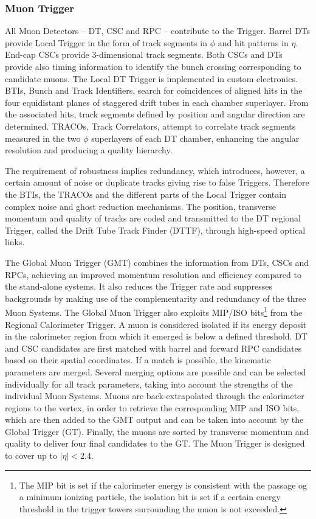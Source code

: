 \subsubsection{Muon Trigger}
All Muon Detectors -- DT, CSC and RPC -- contribute to the Trigger. Barrel
DTs provide Local Trigger in the form of track segments in $\phi$ and hit patterns in
$\eta$. End-cap CSCs provide 3-dimensional track segments. Both CSCs and DTs
provide also timing information to identify the bunch crossing corresponding to
candidate muons. The Local DT Trigger is implemented in custom electronics.
BTIs, Bunch and Track Identifiers, search for coincidences of aligned hits in the
four equidistant planes of staggered drift tubes in each chamber superlayer. From
the associated hits, track segments defined by position and angular direction are
determined. TRACOs, Track Correlators, attempt to correlate track segments
measured in the two $\phi$ superlayers of each DT chamber, enhancing the angular resolution and producing a
quality hierarchy.

The requirement of robustness implies redundancy, which introduces, however,
a certain amount of noise or duplicate tracks giving rise to false Triggers. Therefore 
the BTIs, the TRACOs and the different parts of the Local Trigger contain
complex noise and ghost reduction mechanisms. The position, transverse momentum 
and quality of tracks are coded and transmitted to the DT regional Trigger,
called the Drift Tube Track Finder (DTTF), through high-speed optical
links.

The Global Muon Trigger (GMT) combines the information from DTs, CSCs and
RPCs, achieving an improved momentum resolution and efficiency compared to
the stand-alone systems. It also reduces the Trigger rate and suppresses backgrounds 
by making use of the complementarity and redundancy of the three Muon
Systems. The Global Muon Trigger also exploits MIP/ISO bits\footnote{The MIP bit is set if the calorimeter energy is consistent with the passage og a minimum ionizing particle, the isolation bit is set if a certain energy threshold in the trigger towers surrounding the muon is not exceeded.} from the Regional
Calorimeter Trigger. A muon is considered isolated if its energy deposit in the
calorimeter region from which it emerged is below a defined threshold. DT and
CSC candidates are first matched with barrel and forward RPC candidates based
on their spatial coordinates. If a match is possible, the kinematic parameters are
merged. Several merging options are possible and can be selected individually for
all track parameters, taking into account the strengths of the individual Muon Systems. 
Muons are back-extrapolated through the calorimeter regions to the vertex,
in order to retrieve the corresponding MIP and ISO bits, which are then added to
the GMT output and can be taken into account by the Global Trigger (GT). Finally,
the muons are sorted by transverse momentum and quality to deliver four final
candidates to the GT. The Muon Trigger is designed to cover up to $|\eta|<2.4$.

